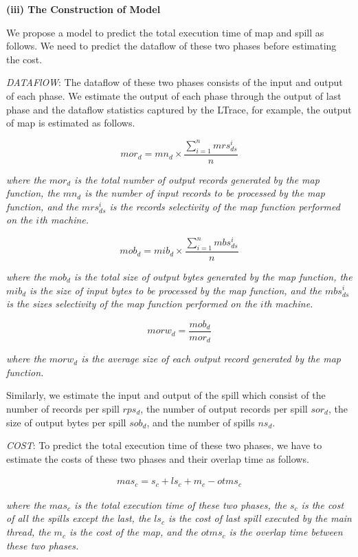 \noindent\textbf{(iii) The Construction of Model}

We propose a model to predict the total execution time of map and spill as follows. We need to predict the dataflow of these two phases before estimating the cost.

\emph{DATAFlOW}: The dataflow of these two phases consists of the input and output of each phase. We estimate the output of each phase through the output of last phase and the dataflow statistics captured by the LTrace, for example, the output of map is estimated as follows.
\begin{small}
$$mor_d=mn_d\times\frac{\sum_{i=1}^nmrs_{ds}^i}{n}$$
\end{small}
\emph{where the $mor_d$ is the total number of output records generated by the map function, the $mn_d$ is the number of input records to be processed by the map function, and the $mrs_{ds}^i$ is the records selectivity of the map function performed on the $i$th machine. }
\begin{small}
$$mob_d=mib_d\times\frac{\sum_{i=1}^nmbs_{ds}^i}{n}$$
\end{small}
\emph{where the $mob_d$ is the total size of output bytes generated by the map function, the $mib_d$ is the size of input bytes to be processed by the map function, and the $mbs_{ds}^i$ is the sizes selectivity of the map function performed on the $i$th machine. }
\begin{small}
$$morw_d=\frac{mob_d}{mor_d}$$
\end{small}
\emph{where the $morw_d$ is the average size of each output record generated by the map function.}

Similarly, we estimate the input and output of the spill which consist of the number of records per spill $rps_d$, the number of output records per spill $sor_d$, the size of output bytes per spill $sob_d$, and the number of spills $ns_d$.

\emph{COST}: To predict the total execution time of these two phases, we have to estimate the costs of these two phases and their overlap time as follows.
\begin{small}
\begin{equation}
\begin{split}
mas_c=s_c+ls_c+m_c-otms_c
\end{split}
\end{equation}
\end{small}
\emph{where the $mas_c$ is the total execution time of these two phases, the $s_c$ is the cost of all the spills except the last, the $ls_c$ is the cost of last spill executed by the main thread, the $m_c$ is the cost of the map, and the $otms_c$ is the overlap time between these two phases.}

